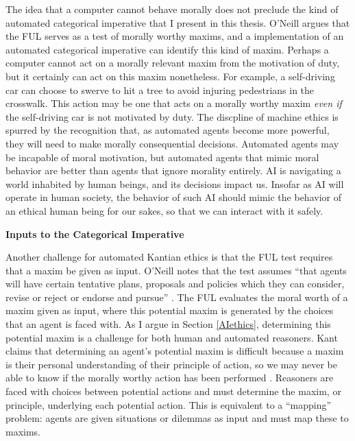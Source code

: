 \begin{isabellebody}
\begin{isamarkuptext}
The idea that a computer cannot behave morally does not preclude the kind 
of automated categorical imperative that I present in this thesis. O'Neill argues that the FUL
serves as a test of morally worthy maxims, and a implementation of an automated categorical imperative can 
identify this kind of maxim. Perhaps a computer cannot act on a morally relevant maxim from the motivation of duty, 
but it certainly can act on this maxim nonetheless. For example, a self-driving car can choose to swerve to hit a tree
to avoid injuring pedestrians in the crosswalk. This action may be one that acts on a morally worthy maxim
\emph{even if} the self-driving car is not motivated by duty. The discpline of machine ethics is
spurred by the recognition that, as automated agents become more powerful, they will need to make
morally consequential decisions. Automated agents may be incapable of moral motivation, but automated agents that mimic
moral behavior are better than agents that ignore morality entirely. AI is navigating a world 
inhabited by human beings, and its decisions impact us. Insofar as AI will operate in human society, 
the behavior of such AI should mimic the behavior of an ethical human being for our sakes, so that we 
can interact with it safely. 

\medskip 

\noindent \textbf{Inputs to the Categorical Imperative}

\medskip

Another challenge for automated Kantian ethics is that the FUL test requires that
a maxim be given as input. O'Neill notes that the test assumes ``that agents will have certain tentative 
plans, proposals and policies which they can consider, revise or reject or endorse and pursue'' \citep[343]{oneilluniversallaws}.
The FUL evaluates the moral worth of a maxim given as input, where this potential maxim is generated by 
the choices that an agent is faced with. As I argue in Section \ref{AIethics}, determining this potential maxim is a challenge for both human
and automated reasoners. Kant claims that determining an agent's potential maxim is difficult because a maxim is their
personal understanding of their principle of action, so we may never be able 
to know if the morally worthy action has been performed \cite[345]{oneilluniversallaws}. Reasoners are faced with
choices between potential actions and must determine the maxim, or principle, underlying each potential action.
This is equivalent to a ``mapping'' problem: agents are given situations or dilemmas as input and must map
these to maxims.


\end{isamarkuptext}
\end{isabellebody}
